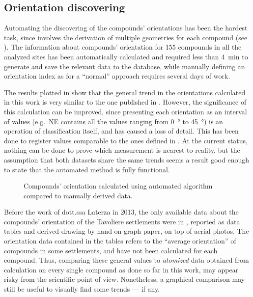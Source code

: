 
        \subsection{Orientation discovering}

            Automating the discovering of the compounds' orientations has been the hardest task, since involves the derivation of multiple geometries for each compound (see ).
            The information about compounds' orientation for 155 compounds in all the analyzed sites has been automatically calculated and required less than \SI{4}{\minute} to generate and save the relevant data to the database, while manually defining an orientation index as for a ``normal'' approach requires several days of work.
            
            The results plotted in  show that the general trend in the orientations calculated in this work is very similar to the one published in \cite{laterza}. However, the significance of this calculation can be improved, since presenting each orientation as an interval of values (e.g.\ NE contains all the values ranging from \SI{0}{\degree} to \SI{45}{\degree}) is an operation of classification itself, and has caused a loss of detail. This has been done to register values comparable to the ones defined in \cite{laterza}. At the current status, nothing can be done to prove which measurement is nearest to reality, but the assumption that both datasets share the same trends seems a result good enough to state that the automated method is fully functional.

            \begin{figure}[H]
                \centering
                \begin{tikzpicture}
                    
                \end{tikzpicture}
                \caption[Orientation of compounds for all the settlements calculated in this work compared with know data.]{Compounds' orientation calculated using automated algorithm compared to manually derived data.}
                \label{fig:graph-orient}
            \end{figure}

            Before the work of dott.ssa Laterza in 2013, the only available data about the compounds' orientation of the Tavoliere settlements were in \textcite[appx.~IV]{jones-tavoliere}, reported as data tables and derived drawing by hand on graph paper, on top of aerial photos. The orientation data contained in the tables refers to the ``average orientation'' of compounds in some settlements, and have not been calculated for each compound. Thus, comparing these general values to \emph{atomized} data obtained from calculation on every single compound as done so far in this work, may appear risky from the scientific point of view. Nonetheless, a graphical comparison may still be useful to visually find some trends --- if any. 

